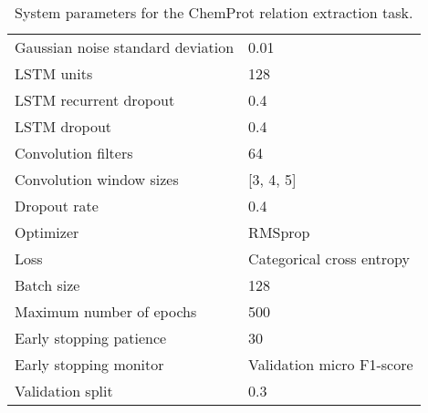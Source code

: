 \begingroup
\begin{table}[!t]

\centering


\caption{System parameters for the ChemProt relation extraction task.}
\label{tab:chemprot-parameters}

\begin{tabular}{D{59mm}G{66mm}}

\toprule

Gaussian noise standard deviation & 0.01\\
LSTM units                        & 128\\
LSTM recurrent dropout            & 0.4\\
LSTM dropout                      & 0.4\\
Convolution filters               & 64\\
Convolution window sizes          & [3, 4, 5]\\
Dropout rate                      & 0.4\\

\midrule

Optimizer & RMSprop \parencite{hinton2012a}\\
Loss      & Categorical cross entropy\\

\midrule

Batch size               & 128\\
Maximum number of epochs & 500\\
Early stopping patience  & 30\\
Early stopping monitor   & Validation micro F1-score\\
Validation split         & 0.3\\

\bottomrule

\end{tabular}

\end{table}
\endgroup
